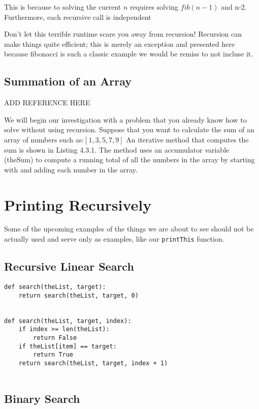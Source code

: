 This is because to solving the current $n$ requires solving $fib(n-1)$ and n-2.  Furthermore, each recursive call is independent



Don't let this terrible runtime scare you away from recursion!  Recursion can make things quite efficient; this is merely an exception and presented here because fibonacci is such a classic example we would be remiss to not incluse it.



\subsection{Summation of an Array}
ADD REFERENCE HERE


We will begin our investigation with a problem that you already know how to solve without using recursion. Suppose that you want to calculate the sum of an array of numbers such as:$[1, 3, 5, 7, 9]$ An iterative method that computes the sum is shown in Listing 4.3.1. The method uses an accumulator variable (theSum) to compute a running total of all the numbers in the array by starting with and adding each number in the array.

\section{Printing Recursively}
Some of the upcoming examples  of the things we are about to see should not be actually  used and serve only as examples, like our \texttt{printThis} function.



\subsection{Recursive Linear Search}




\begin{verbatim}
def search(theList, target):
	return search(theList, target, 0)


def search(theList, target, index):
	if index >= len(theList):
		return False 
	if theList[item] == target:
		return True
	return search(theList, target, index + 1)
	
\end{verbatim}


\subsection{Binary Search}






